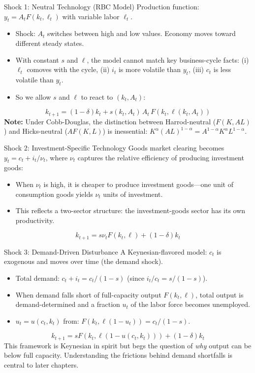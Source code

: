 \documentclass[aspectratio=169,10pt]{beamer}
\begin{document}
\begin{frame}{Shock 1: Neutral Technology (RBC Model)}
Production function: $y_t = A_t F(k_t, \ell_t)$ with variable labor $\ell_t$.
\begin{itemize}
  \item Shock: $A_t$ switches between high and low values. Economy moves toward different steady states.
  \item With constant $s$ and $\ell$, the model cannot match key business-cycle facts: (i) $\ell_t$ comoves with the cycle, (ii) $i_t$ is more volatile than $y_t$, (iii) $c_t$ is less volatile than $y_t$.
  \item So we allow $s$ and $\ell$ to react to $(k_t, A_t)$:
\end{itemize}
\[
k_{t+1}=(1-\delta)k_t+s(k_t,A_t)\,A_t\,F(k_t,\ell(k_t,A_t))
\]
\textbf{Note:} Under Cobb-Douglas, the distinction between Harrod-neutral ($F(K, AL)$) and Hicks-neutral ($AF(K,L)$) is inessential: $K^{\alpha}(AL)^{1-\alpha} = A^{1-\alpha}K^{\alpha}L^{1-\alpha}$.
\end{frame}

\begin{frame}{Shock 2: Investment-Specific Technology}
Goods market clearing becomes $y_t = c_t + i_t/\nu_t$, where $\nu_t$ captures the relative efficiency of producing investment goods:
\begin{itemize}
  \item When $\nu_t$ is high, it is cheaper to produce investment goods---one unit of consumption goods yields $\nu_t$ units of investment.
  \item This reflects a two-sector structure: the investment-goods sector has its own productivity.
\end{itemize}
\[
k_{t+1}=s\nu_tF(k_t,\ell)+(1-\delta)k_t
\]
\end{frame}

\begin{frame}{Shock 3: Demand-Driven Disturbance}
A Keynesian-flavored model: $c_t$ is exogenous and moves over time (the demand shock).
\begin{itemize}
  \item Total demand: $c_t + i_t = c_t/(1-s)$ (since $i_t/c_t = s/(1-s)$).
  \item When demand falls short of full-capacity output $F(k_t, \ell)$, total output is demand-determined and a fraction $u_t$ of the labor force becomes unemployed.
  \item $u_t = u(c_t, k_t)$ from: $F(k_t, \ell(1-u_t)) = c_t/(1-s)$.
\end{itemize}
\[
k_{t+1}=sF(k_t,\ell(1-u(c_t,k_t)))+(1-\delta)k_t
\]
This framework is Keynesian in spirit but begs the question of \emph{why} output can be below full capacity. Understanding the frictions behind demand shortfalls is central to later chapters.
\end{frame}
\end{document}
